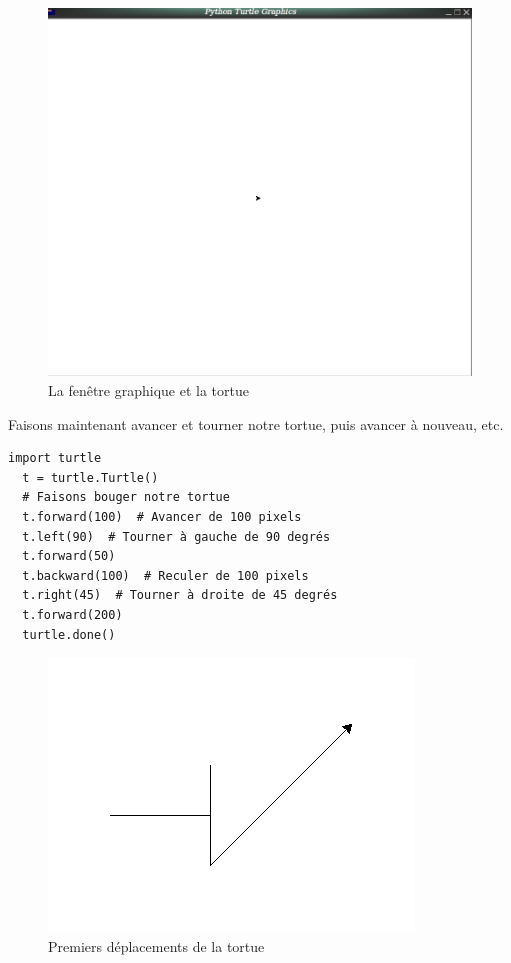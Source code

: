 \documentclass[a4paper,12pt]{book}
\begin{document}
\begin{figure}[h]
\begin{center}
\includegraphics[scale=0.15]{IMG/turtle-01.png}
\caption{La fenêtre graphique et la tortue}
\end{center}
\end{figure}
\medskip

Faisons maintenant avancer et tourner notre tortue, puis avancer à nouveau, etc.
\begin{lstlisting}[caption=La tortue se déplace]
  import turtle
  t = turtle.Turtle()
  # Faisons bouger notre tortue
  t.forward(100)  # Avancer de 100 pixels
  t.left(90)  # Tourner à gauche de 90 degrés
  t.forward(50)
  t.backward(100)  # Reculer de 100 pixels
  t.right(45)  # Tourner à droite de 45 degrés
  t.forward(200)
  turtle.done()
\end{lstlisting}
\medskip

\begin{figure}[h]
\begin{center}
\includegraphics[scale=0.4]{IMG/turtle-02.png}
\caption{Premiers déplacements de la tortue}
\end{center}
\end{figure}
\medskip
\end{document}
